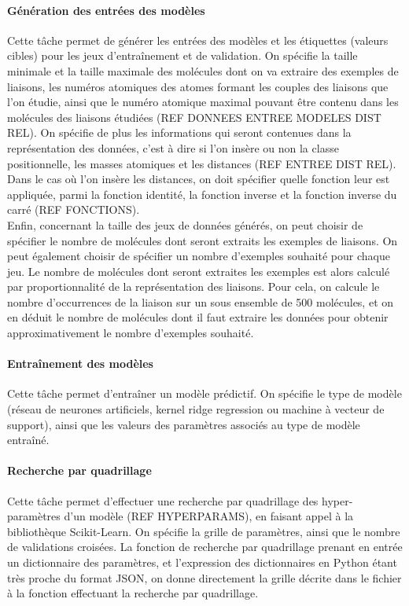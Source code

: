\paragraph{Génération des entrées des modèles } Cette tâche permet de générer les entrées des modèles et les étiquettes (valeurs cibles) pour les jeux d'entraînement et de validation. On spécifie la taille minimale et la taille maximale des molécules dont on va extraire des exemples de liaisons, les numéros atomiques des atomes formant les couples des liaisons que l'on étudie, ainsi que le numéro atomique maximal pouvant être contenu dans les molécules des liaisons étudiées (REF DONNEES ENTREE MODELES DIST REL). On spécifie de plus les informations qui seront contenues dans la représentation des données, c'est à dire si l'on insère ou non la classe positionnelle, les masses atomiques et les distances (REF ENTREE DIST REL). Dans le cas où l'on insère les distances, on doit spécifier quelle fonction leur est appliquée, parmi la fonction identité, la fonction inverse et la fonction inverse du carré (REF FONCTIONS).\\
Enfin, concernant la taille des jeux de données générés, on peut choisir de spécifier le nombre de molécules dont seront extraits les exemples de liaisons. On peut également choisir de spécifier un nombre d'exemples souhaité pour chaque jeu. Le nombre de molécules dont seront extraites les exemples est alors calculé par proportionnalité de la représentation des liaisons. Pour cela, on calcule le nombre d'occurrences de la liaison sur un sous ensemble de 500 molécules, et on en déduit le nombre de molécules dont il faut extraire les données pour obtenir approximativement le nombre d'exemples souhaité.

\paragraph{Entraînement des modèles} Cette tâche permet d'entraîner un modèle prédictif. On spécifie le type de modèle (réseau de neurones artificiels, kernel ridge regression ou machine à vecteur de support), ainsi que les valeurs des paramètres associés au type de modèle entraîné.

\paragraph{Recherche par quadrillage} Cette tâche permet d'effectuer une recherche par quadrillage des hyper-paramètres d'un modèle (REF HYPERPARAMS), en faisant appel à la bibliothèque Scikit-Learn\cite{sklearn}. On spécifie la grille de paramètres, ainsi que le nombre de validations croisées. La fonction de recherche par quadrillage prenant en entrée un dictionnaire des paramètres, et l'expression des dictionnaires en Python étant très proche du format JSON, on donne directement la grille décrite dans le fichier à la fonction effectuant la recherche par quadrillage.

